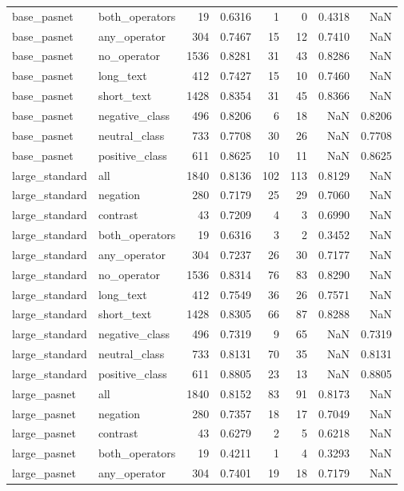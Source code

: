 \begin{tabular}{llrrrrrr}
base\_pasnet & both\_operators & 19 & 0.6316 & 1 & 0 & 0.4318 & NaN \\
base\_pasnet & any\_operator & 304 & 0.7467 & 15 & 12 & 0.7410 & NaN \\
base\_pasnet & no\_operator & 1536 & 0.8281 & 31 & 43 & 0.8286 & NaN \\
base\_pasnet & long\_text & 412 & 0.7427 & 15 & 10 & 0.7460 & NaN \\
base\_pasnet & short\_text & 1428 & 0.8354 & 31 & 45 & 0.8366 & NaN \\
base\_pasnet & negative\_class & 496 & 0.8206 & 6 & 18 & NaN & 0.8206 \\
base\_pasnet & neutral\_class & 733 & 0.7708 & 30 & 26 & NaN & 0.7708 \\
base\_pasnet & positive\_class & 611 & 0.8625 & 10 & 11 & NaN & 0.8625 \\
large\_standard & all & 1840 & 0.8136 & 102 & 113 & 0.8129 & NaN \\
large\_standard & negation & 280 & 0.7179 & 25 & 29 & 0.7060 & NaN \\
large\_standard & contrast & 43 & 0.7209 & 4 & 3 & 0.6990 & NaN \\
large\_standard & both\_operators & 19 & 0.6316 & 3 & 2 & 0.3452 & NaN \\
large\_standard & any\_operator & 304 & 0.7237 & 26 & 30 & 0.7177 & NaN \\
large\_standard & no\_operator & 1536 & 0.8314 & 76 & 83 & 0.8290 & NaN \\
large\_standard & long\_text & 412 & 0.7549 & 36 & 26 & 0.7571 & NaN \\
large\_standard & short\_text & 1428 & 0.8305 & 66 & 87 & 0.8288 & NaN \\
large\_standard & negative\_class & 496 & 0.7319 & 9 & 65 & NaN & 0.7319 \\
large\_standard & neutral\_class & 733 & 0.8131 & 70 & 35 & NaN & 0.8131 \\
large\_standard & positive\_class & 611 & 0.8805 & 23 & 13 & NaN & 0.8805 \\
large\_pasnet & all & 1840 & 0.8152 & 83 & 91 & 0.8173 & NaN \\
large\_pasnet & negation & 280 & 0.7357 & 18 & 17 & 0.7049 & NaN \\
large\_pasnet & contrast & 43 & 0.6279 & 2 & 5 & 0.6218 & NaN \\
large\_pasnet & both\_operators & 19 & 0.4211 & 1 & 4 & 0.3293 & NaN \\
large\_pasnet & any\_operator & 304 & 0.7401 & 19 & 18 & 0.7179 & NaN \\

\end{tabular}
